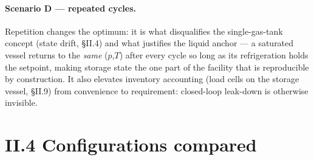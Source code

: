 \paragraph{Scenario D --- repeated cycles.} Repetition changes the
optimum: it is what disqualifies the single-gas-tank concept (state
drift, \S II.4) and what justifies the liquid anchor --- a saturated
vessel returns to the \emph{same} ($p$,$T$) after every cycle so long
as its refrigeration holds the setpoint, making storage state the one
part of the facility that is reproducible by construction. It also
elevates inventory accounting (load cells on the storage vessel,
\S II.9) from convenience to requirement: closed-loop leak-down is
otherwise invisible.

\section{II.4 Configurations compared}

